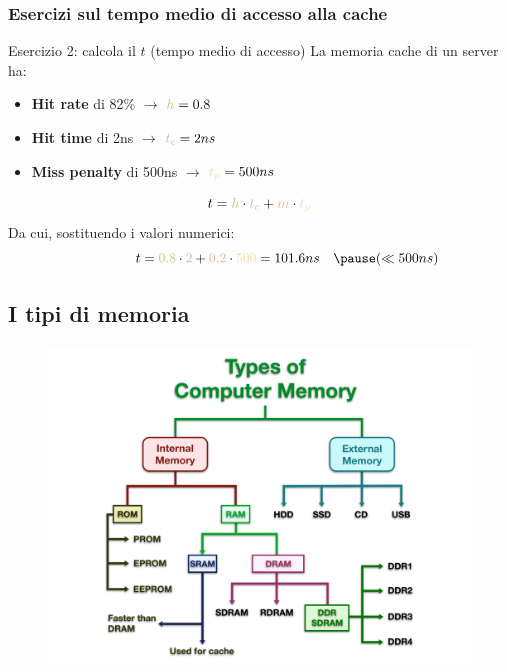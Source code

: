 \begin{frame}
	\frametitle{Esercizi sul tempo medio di accesso alla cache}
	
	\begin{block}{Esercizio 2: calcola il $t$ (tempo medio di accesso)}
		La memoria cache di un server ha:
			\begin{itemize}
				\item \textbf{Hit rate} di 82\% \hspace{9.5em} $\rightarrow$ \hspace{2em} ${\color{CpuGreen}h} = 0.8$
				\item \textbf{Hit time} di 2ns \hspace{9.7em} $\rightarrow$ \hspace{2em} ${\color{CpuBlue}t_c} = 2ns$
				\item \textbf{Miss penalty} di 500ns \hspace{6.8em} $\rightarrow$ \hspace{2em} ${\color{CpuPink}t_p} = 500ns$
			\end{itemize}
		\end{block}
		\pause
		$$t = {\color{CpuGreen}h} \cdot {\color{CpuBlue}t_c} + {\color{CpuRed}m} \cdot {\color{CpuPink}t_p}$$
		\pause
		Da cui, sostituendo i valori numerici:
		\pause
		$$\qquad \qquad t = {\color{CpuGreen}0.8} \cdot {\color{CpuBlue}2} + {\color{CpuRed}0.2} \cdot {\color{CpuPink}500} = 101.6ns \quad \pause (\ll 500ns)$$
	

\end{frame}



\subsection[I tipi di memoria]{I tipi di memoria}
\begin{frame}
	\begin{figure}[!htbp] 
		\centering
		\includegraphics[width=0.95\linewidth]{images/5_memory/memory_types.pdf}
	\end{figure}
		
\end{frame}


